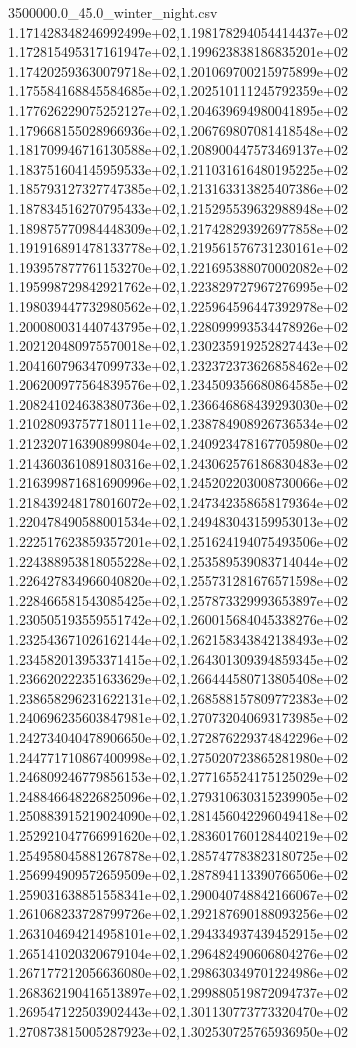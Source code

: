 \begin{filecontents*}{3500000.0_45.0_winter_night.csv}
1.171428348246992499e+02,1.198178294054414437e+02
1.172815495317161947e+02,1.199623838186835201e+02
1.174202593630079718e+02,1.201069700215975899e+02
1.175584168845584685e+02,1.202510111245792359e+02
1.177626229075252127e+02,1.204639694980041895e+02
1.179668155028966936e+02,1.206769807081418548e+02
1.181709946716130588e+02,1.208900447573469137e+02
1.183751604145959533e+02,1.211031616480195225e+02
1.185793127327747385e+02,1.213163313825407386e+02
1.187834516270795433e+02,1.215295539632988948e+02
1.189875770984448309e+02,1.217428293926977858e+02
1.191916891478133778e+02,1.219561576731230161e+02
1.193957877761153270e+02,1.221695388070002082e+02
1.195998729842921762e+02,1.223829727967276995e+02
1.198039447732980562e+02,1.225964596447392978e+02
1.200080031440743795e+02,1.228099993534478926e+02
1.202120480975570018e+02,1.230235919252827443e+02
1.204160796347099733e+02,1.232372373626858462e+02
1.206200977564839576e+02,1.234509356680864585e+02
1.208241024638380736e+02,1.236646868439293030e+02
1.210280937577180111e+02,1.238784908926736534e+02
1.212320716390899804e+02,1.240923478167705980e+02
1.214360361089180316e+02,1.243062576186830483e+02
1.216399871681690996e+02,1.245202203008730066e+02
1.218439248178016072e+02,1.247342358658179364e+02
1.220478490588001534e+02,1.249483043159953013e+02
1.222517623859357201e+02,1.251624194075493506e+02
1.224388953818055228e+02,1.253589539083714044e+02
1.226427834966040820e+02,1.255731281676571598e+02
1.228466581543085425e+02,1.257873329993653897e+02
1.230505193559551742e+02,1.260015684045338276e+02
1.232543671026162144e+02,1.262158343842138493e+02
1.234582013953371415e+02,1.264301309394859345e+02
1.236620222351633629e+02,1.266444580713805408e+02
1.238658296231622131e+02,1.268588157809772383e+02
1.240696235603847981e+02,1.270732040693173985e+02
1.242734040478906650e+02,1.272876229374842296e+02
1.244771710867400998e+02,1.275020723865281980e+02
1.246809246779856153e+02,1.277165524175125029e+02
1.248846648226825096e+02,1.279310630315239905e+02
1.250883915219024090e+02,1.281456042296049418e+02
1.252921047766991620e+02,1.283601760128440219e+02
1.254958045881267878e+02,1.285747783823180725e+02
1.256994909572659509e+02,1.287894113390766506e+02
1.259031638851558341e+02,1.290040748842166067e+02
1.261068233728799726e+02,1.292187690188093256e+02
1.263104694214958101e+02,1.294334937439452915e+02
1.265141020320679104e+02,1.296482490606804276e+02
1.267177212056636080e+02,1.298630349701224986e+02
1.268362190416513897e+02,1.299880519872094737e+02
1.269547122503902443e+02,1.301130773773320470e+02
1.270873815005287923e+02,1.302530725765936950e+02

\end{filecontents*}
